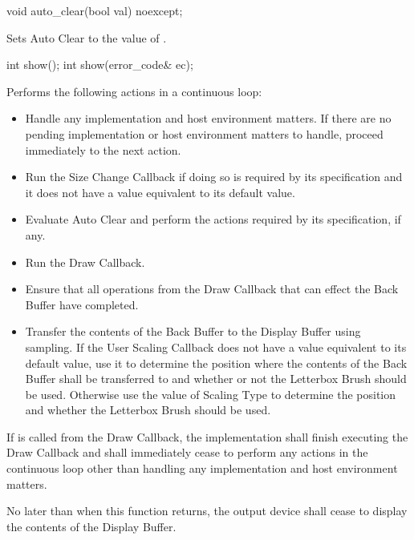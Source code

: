 \begin{itemdecl}
void auto_clear(bool val) noexcept;
\end{itemdecl}
\begin{itemdescr}
\pnum
\effects
Sets Auto Clear to the value of .
\end{itemdescr}

\begin{itemdecl}
int show();
int show(error_code& ec);
\end{itemdecl}
\begin{itemdescr}
\pnum
\effects
Performs the following actions in a continuous loop:
\begin{itemize}
	\item Handle any implementation and host environment matters. If there are no pending implementation or host environment matters to handle, proceed immediately to the next action.
	\item Run the Size Change Callback if doing so is required by its specification and it does not have a value equivalent to its default value. 
	\item Evaluate Auto Clear and perform the actions required by its specification, if any.
	\item Run the Draw Callback.
	\item Ensure that all operations from the Draw Callback that can effect the Back Buffer have completed.
	\item Transfer the contents of the Back Buffer to the Display Buffer using sampling. If the User Scaling Callback does not have a value equivalent to its default value, use it to determine the position where the contents of the Back Buffer shall be transferred to and whether or not the Letterbox Brush should be used. Otherwise use the value of Scaling Type to determine the position and whether the Letterbox Brush should be used.
\end{itemize}

\pnum
If  is called from the Draw Callback, the implementation shall finish executing the Draw Callback and shall immediately cease to perform any actions in the continuous loop other than handling any implementation and host environment matters.

\pnum
No later than when this function returns, the output device shall cease to display the contents of the Display Buffer.


\end{itemdescr}
